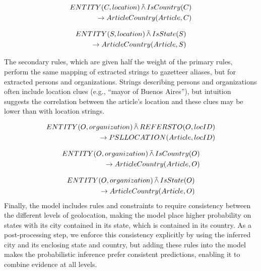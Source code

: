 \begin{align*}
    \begin{split}
        ENTITY(C, location) \softand IsCountry(C)\\
    \rightarrow ArticleCountry(Article, C)
\end{split}
\end{align*}


\begin{align*}
    \begin{split}
        ENTITY(S, location) \softand IsState(S)\\
    \rightarrow ArticleCountry(Article, S)
\end{split}
\end{align*}

The secondary rules, which are given half the weight of the primary rules, perform the same mapping of extracted strings to gazetteer aliases, but for extracted persons and organizations. Strings describing persons and organizations often include location clues (e.g., ``mayor of Buenos Aires''), but intuition suggests the correlation between the article's location and these clues may be lower than with location strings. 

\begin{align*}
    \begin{split}
        ENTITY(O, organization) \softand REFERSTO(O, locID)\\
    \rightarrow PSLLOCATION(Article, locID)
\end{split}
\end{align*}


\begin{align*}
    \begin{split}
        ENTITY(O, organization) \softand IsCountry(O)\\
    \rightarrow ArticleCountry(Article, O)
\end{split}
\end{align*}


\begin{align*}
    \begin{split}
        ENTITY(O, organization) \softand IsState(O)\\
    \rightarrow ArticleCountry(Article, O)
\end{split}
\end{align*}
Finally, the model includes rules and constraints to require consistency between the different levels of geolocation, making the model place higher probability on states with its city contained in its state, which is contained in its country. As a post-processing step, we enforce this consistency explicitly by using the inferred city and its enclosing state and country, but adding these rules into the model makes the probabilistic inference prefer consistent predictions, enabling it to combine evidence at all levels.

